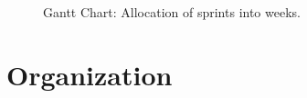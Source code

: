 \documentclass{article}
\begin{document}
\begin{figure}
\begin{center}
\label{fig:gantt}
\caption{Gantt Chart: Allocation of sprints into weeks.}
\begin{sideways}
\begin{gantt}{8}{14}
    \begin{ganttitle}
    \end{ganttitle}
\end{gantt}
\end{sideways}
\end{center}
\end{figure}

\section{Organization}
\end{document}
